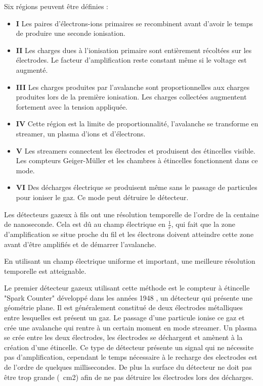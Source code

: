 Six régions peuvent être définies :

\begin{itemize}
	\item \textbf{I} Les paires d'électrons-ions primaires se recombinent avant d'avoir le temps de produire une seconde ionisation.
	\item \textbf{II} Les charges dues à l'ionisation primaire sont entièrement récoltées sur les électrodes. Le facteur d'amplification reste constant même si le voltage est augmenté.
	\item \textbf{III} Les charges produites par l'avalanche sont proportionnelles aux charges produites lors de la première ionisation. Les charges collectées augmentent fortement avec la tension appliquée.
	\item \textbf{IV} Cette région est la limite de proportionnalité, l'avalanche se transforme en streamer, un plasma d'ions et d'électrons.
	\item \textbf{V} Les streamers connectent les électrodes et produisent des étincelles visible. Les compteurs Geiger-Müller et les chambres à étincelles fonctionnent dans ce mode.
	\item \textbf{VI} Des décharges électrique se produisent même sans le passage de particules pour ioniser le gaz. Ce mode peut détruire le détecteur.
\end{itemize}

Les détecteurs gazeux à fils ont une résolution temporelle de l'ordre de la centaine de nanoseconde. Cela est dû au champ électrique en $\frac{1}{r}$, qui fait que la zone d'amplification se situe proche du fil et les électrons doivent atteindre cette zone avant d'être amplifiés et de démarrer l'avalanche.

En utilisant un champ électrique uniforme et important, une meilleure résolution temporelle est atteignable.

Le premier détecteur gazeux utilisant cette méthode est le compteur à étincelle "Spark Counter" développé dans les années 1948 , un détecteur qui présente une géométrie plane. Il est généralement constitué de deux électrodes métalliques entre lesquelles est présent un gaz. Le passage d'une particule ionise ce gaz et crée une avalanche qui rentre à un certain moment en mode streamer. Un plasma se crée entre les deux électrodes, les électrodes se déchargent et amènent à la création d'une étincelle. Ce type de détecteur présente un signal qui ne nécessite pas d'amplification, cependant le temps nécessaire à le recharge des electrodes est de l'ordre de quelques millisecondes. De plus la surface du détecteur ne doit pas être trop grande (~cm2) afin de ne pas détruire les électrodes lors des décharges.


